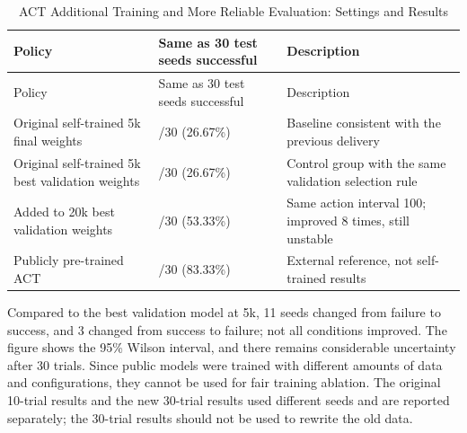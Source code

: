 \FloatBarrier\begingroup\small\setlength{\tabcolsep}{2.5pt}
\begin{longtable}[]{@{}
  >{\raggedright\arraybackslash}p{}
  >{\raggedleft\arraybackslash}p{}
  >{\raggedright\arraybackslash}p{}@{}}
\caption{ACT Additional Training and More Reliable Evaluation: Settings and Results}\label{tab:s04-1}\tabularnewline
\toprule\noalign{}
\begin{minipage}[b]{\linewidth}\raggedright
Policy
\end{minipage} & \begin{minipage}[b]{\linewidth}\raggedleft
Same as 30 test seeds successful
\end{minipage} & \begin{minipage}[b]{\linewidth}\raggedright
Description
\end{minipage} \\
\midrule\noalign{}
\endfirsthead
\toprule\noalign{}
\begin{minipage}[b]{\linewidth}\raggedright
Policy
\end{minipage} & \begin{minipage}[b]{\linewidth}\raggedleft
Same as 30 test seeds successful
\end{minipage} & \begin{minipage}[b]{\linewidth}\raggedright
Description
\end{minipage} \\
\midrule\noalign{}
\endhead
\bottomrule\noalign{}
\endlastfoot
Original self-trained 5k final weights & 8/30 (26.67\%) & Baseline consistent with the previous delivery \\
Original self-trained 5k best validation weights & 8/30 (26.67\%) & Control group with the same validation selection rule \\
Added to 20k best validation weights & 16/30 (53.33\%) & Same action interval 100; improved 8 times, still unstable \\
Publicly pre-trained ACT & 25/30 (83.33\%) & External reference, not self-trained results \\
\end{longtable}\endgroup


Compared to the best validation model at 5k, 11 seeds changed from failure to success, and 3 changed from success to failure; not all conditions improved. The figure shows the 95\% Wilson interval, and there remains considerable uncertainty after 30 trials. Since public models were trained with different amounts of data and configurations, they cannot be used for fair training ablation. The original 10-trial results and the new 30-trial results used different seeds and are reported separately; the 30-trial results should not be used to rewrite the old data.

